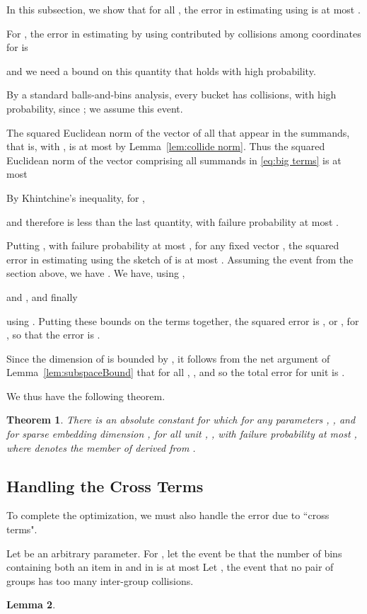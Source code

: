 \documentclass{sig-alternate}
\newtheorem{theorem}{Theorem}
\newtheorem{lemma}[theorem]{Lemma}
\begin{document}
In this subsection, we show that for all ,
the error in estimating  using 
is at most . 

For , the error in estimating
 by using  contributed
by collisions among coordinates  for  is

and we need a bound on this quantity that holds with high probability.



By a standard balls-and-bins analysis, every bucket has 
collisions, with high probability,
since ; we assume this event.

The squared Euclidean norm of the vector
of all  that appear in the summands, that is, with , is
at most  by Lemma~\ref{lem:collide norm}.
Thus the squared Euclidean norm
of the vector comprising all summands in \eqref{eq:big terms}
is at most


By Khintchine's inequality, for ,

and therefore  is less than the last quantity, with failure probability
at most .

Putting , with failure probability at
most , 
for any fixed vector , the squared error in estimating
 using the sketch of  is at most
.
Assuming the event  from the section above,
we have . 
We have, using ,

and ,
and finally

using .
Putting these bounds on the terms together,
the squared error is , or , for
, so that the error is .

Since the dimension of 
is bounded by , it follows from the net argument of Lemma~\ref{lem:subspaceBound}
that for all , ,
and so the total error for unit  is .

We thus have the following theorem. 

\begin{theorem}\label{thm:partition within}
There is an absolute constant  for which 
for any parameters , , and for sparse embedding dimension 
, for all unit ,
,
with failure probability at most ,
where  denotes the member of  derived from .
\end{theorem}

\subsection{Handling the Cross Terms}

To complete the optimization, we must also handle the error due to ``cross terms".

Let  be an arbitrary parameter. 
For , let the event 
 be that the number of bins containing both an item in 
and in  is at most 
Let , the
event that no pair of groups has too many inter-group collisions.
\begin{lemma}\label{lem:E}

\end{lemma}
\end{document}
